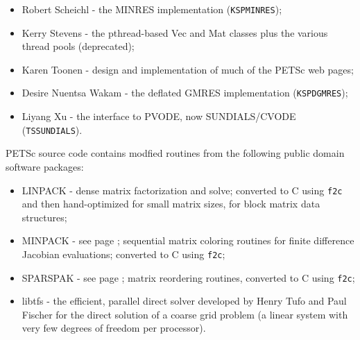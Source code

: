 \begin{itemize}
  \item Robert Scheichl - the MINRES implementation (\lstinline{KSPMINRES});
  \item Kerry Stevens - the pthread-based Vec and Mat classes plus the various thread pools (deprecated);
  \item Karen Toonen - design and implementation of much of the PETSc web pages;
  \item Desire Nuentsa Wakam - the deflated GMRES implementation (\lstinline{KSPDGMRES});
  \item Liyang Xu - the interface to PVODE, now SUNDIALS/CVODE (\lstinline{TSSUNDIALS}).
\end{itemize}

\vspace{.3in}
\noindent
PETSc source code contains modfied routines from the following public domain software packages:
\begin{itemize}
  \item LINPACK -    dense matrix factorization and solve; converted to C using {\tt f2c} and then
                     hand-optimized for small matrix sizes, for block matrix data structures;
  \item MINPACK -    see page \pageref{sec_fdmatrix}; sequential matrix coloring routines for finite difference Jacobian
                     evaluations; converted to C using {\tt f2c};
  \item SPARSPAK -   see page \pageref{sec_factorization}; matrix reordering routines, converted to C using {\tt f2c};
  \item libtfs     - the efficient, parallel direct solver developed by Henry Tufo and Paul Fischer for the direct solution of a coarse grid problem
                     (a linear system with very few degrees of freedom per processor).
\end{itemize}



